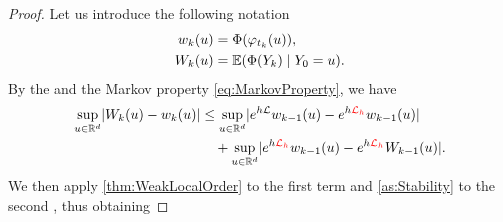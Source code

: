 \documentclass[10pt]{article}
\begin{document}
\begin{proof} Let us introduce the following notation
	\begin{equation}
		\begin{aligned}
			w_k(u) &= \Phi(\varphi_{t_k}(u)),\\
			W_k(u) &= \operatorname{\mathbb{E}}(\Phi(Y_k) \mid Y_0 = u).
		\end{aligned}
	\end{equation}
	By the  and the Markov property \eqref{eq:MarkovProperty}, we have
	\begin{equation}
		\begin{aligned}
			\sup_{u\in\mathbb{R}^d}\lvert W_k(u) - w_k(u)\rvert &\leq \sup_{u\in\mathbb{R}^d}\lvert e^{h\mathcal{L}}w_{k-1}(u) - e^{h{\color{red}\mathcal{L}_h}}w_{k-1}(u)\rvert \\
			&\quad + \sup_{u\in\mathbb{R}^d}\lvert e^{h{\color{red}\mathcal{L}_h}}w_{k-1}(u) - e^{h{\color{red}\mathcal{L}_h}}W_{k-1}(u)\rvert.
		\end{aligned}
	\end{equation}
	We then apply \cref{thm:WeakLocalOrder} to the first term and \cref{as:Stability} to the second , thus obtaining
\end{proof}
\end{document}
